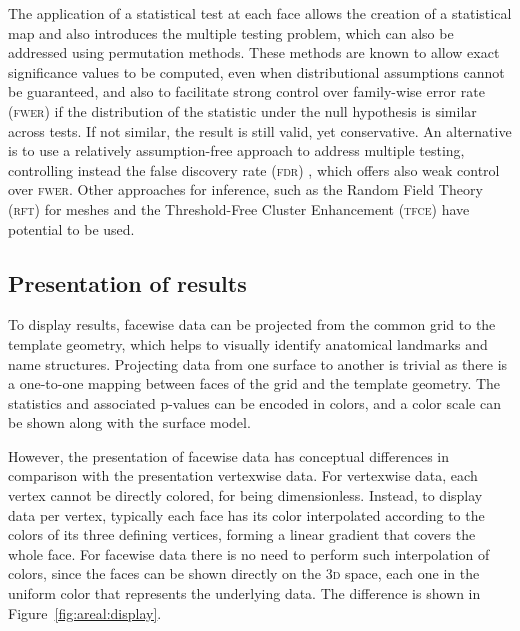 The application of a statistical test at each face allows the creation of a statistical map and also introduces the multiple testing problem, which can also be addressed using permutation methods. These methods are known to allow exact significance values to be computed, even when distributional assumptions cannot be guaranteed, and also to facilitate strong control over family-wise error rate (\textsc{fwer}) if the distribution of the statistic under the null hypothesis is similar across tests. If not similar, the result is still valid, yet conservative. An alternative is to use a relatively assumption-free approach to address multiple testing, controlling instead the false discovery rate (\textsc{fdr}) \citep{Benjamini1995, Genovese2002}, which offers also weak control over \textsc{fwer}. Other approaches for inference, such as the Random Field Theory (\textsc{rft}) for meshes \citep{Worsley1999, Hagler2006} and the Threshold-Free Cluster Enhancement (\textsc{tfce}) \citep{Smith2009} have potential to be used.

\subsection{Presentation of results}
\label{sec:areal:presentation}

To display results, facewise data can be projected from the common grid to the template geometry, which helps to visually identify anatomical landmarks and name structures. Projecting data from one surface to another is trivial as there is a one-to-one mapping between faces of the grid and the template geometry. The statistics and associated p-values can be encoded in colors, and a color scale can be shown along with the surface model.

However, the presentation of facewise data has conceptual differences in comparison with the presentation vertexwise data. For vertexwise data, each vertex cannot be directly colored, for being dimensionless. Instead, to display data per vertex, typically each face has its color interpolated according to the colors of its three defining vertices, forming a linear gradient that covers the whole face. For facewise data there is no need to perform such interpolation of colors, since the faces can be shown directly on the \textsc{3d} space, each one in the uniform color that represents the underlying data. The difference is shown in Figure~\ref{fig:areal:display}.

